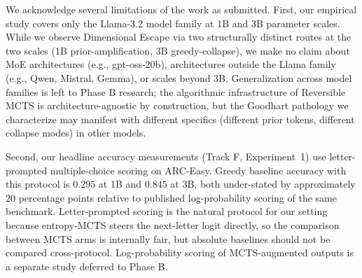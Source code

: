 We acknowledge several limitations of the work as submitted. First, our empirical study covers only the Llama-3.2 model family at 1B and 3B parameter scales. While we observe Dimensional Escape via two structurally distinct routes at the two scales (1B prior-amplification, 3B greedy-collapse), we make no claim about MoE architectures (e.g., gpt-oss-20b), architectures outside the Llama family (e.g., Qwen, Mistral, Gemma), or scales beyond 3B. Generalization across model families is left to Phase B research; the algorithmic infrastructure of Reversible MCTS is architecture-agnostic by construction, but the Goodhart pathology we characterize may manifest with different specifics (different prior tokens, different collapse modes) in other models.

Second, our headline accuracy measurements (Track F, Experiment~1) use letter-prompted multiple-choice scoring on ARC-Easy. Greedy baseline accuracy with this protocol is $0.295$ at 1B and $0.845$ at 3B, both under-stated by approximately $20$ percentage points relative to published log-probability scoring of the same benchmark. Letter-prompted scoring is the natural protocol for our setting because entropy-MCTS steers the next-letter logit directly, so the comparison between MCTS arms is internally fair, but absolute baselines should not be compared cross-protocol. Log-probability scoring of MCTS-augmented outputs is a separate study deferred to Phase B.

